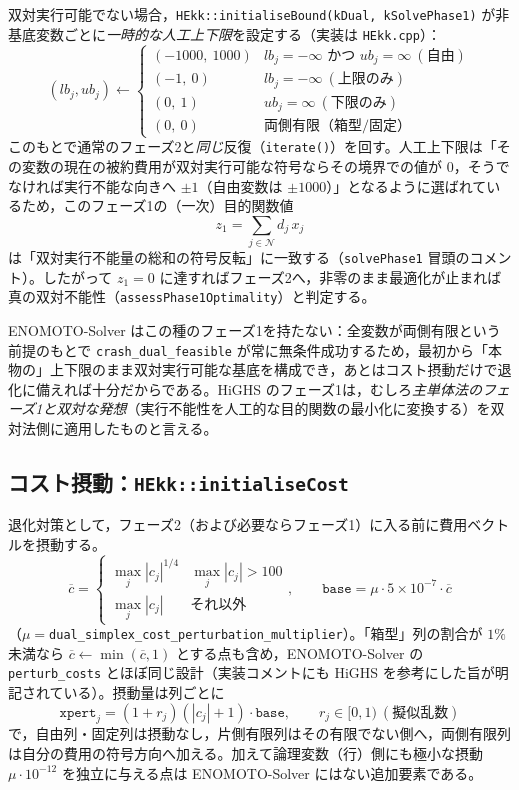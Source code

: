 \documentclass[11pt,a4paper]{ltjsarticle}
\newcommand{\code}[1]{\texttt{#1}}
\begin{document}
双対実行可能でない場合，\code{HEkk::initialiseBound(kDual, kSolvePhase1)} が非基底変数ごとに\emph{一時的な人工上下限}を設定する（実装は \code{HEkk.cpp}）：
\[
  (lb_j, ub_j) \leftarrow
  \begin{cases}
    (-1000,\ 1000) & lb_j=-\infty \text{ かつ } ub_j=\infty\ (\text{自由})\\
    (-1,\ 0) & lb_j = -\infty\ (\text{上限のみ})\\
    (0,\ 1) & ub_j = \infty\ (\text{下限のみ})\\
    (0,\ 0) & \text{両側有限（箱型/固定）}
  \end{cases}
\]
このもとで通常のフェーズ2と\emph{同じ}反復（\code{iterate()}）を回す。人工上下限は「その変数の現在の被約費用が双対実行可能な符号ならその境界での値が $0$，そうでなければ実行不能な向きへ $\pm 1$（自由変数は $\pm 1000$）」となるように選ばれているため，このフェーズ1の（一次）目的関数値
\[
  z_1 = \sum_{j\in\mathcal N} d_j\, x_j
\]
は「双対実行不能量の総和の符号反転」に一致する（\code{solvePhase1} 冒頭のコメント）。したがって $z_1=0$ に達すればフェーズ2へ，非零のまま最適化が止まれば真の双対不能性（\code{assessPhase1Optimality}）と判定する。

ENOMOTO-Solver はこの種のフェーズ1を持たない：全変数が両側有限という前提のもとで \code{crash\_dual\_feasible} が常に無条件成功するため，最初から「本物の」上下限のまま双対実行可能な基底を構成でき，あとはコスト摂動だけで退化に備えれば十分だからである。HiGHS のフェーズ1は，むしろ\emph{主単体法のフェーズ1と双対な発想}（実行不能性を人工的な目的関数の最小化に変換する）を双対法側に適用したものと言える。

\subsection{コスト摂動：\code{HEkk::initialiseCost}}

退化対策として，フェーズ2（および必要ならフェーズ1）に入る前に費用ベクトルを摂動する。
\[
  \overline c = \begin{cases}\max_j|c_j|^{1/4} & \max_j|c_j|>100\\ \max_j|c_j| & \text{それ以外}\end{cases},
  \qquad
  \code{base} = \mu \cdot 5\times10^{-7}\cdot \overline c
\]
（$\mu=$\code{dual\_simplex\_cost\_perturbation\_multiplier}）。「箱型」列の割合が $1\%$ 未満なら $\overline c \leftarrow \min(\overline c, 1)$ とする点も含め，ENOMOTO-Solver の \code{perturb\_costs} とほぼ同じ設計（実装コメントにも HiGHS を参考にした旨が明記されている）。摂動量は列ごとに
\[
  \code{xpert}_j = (1+r_j)(|c_j|+1)\cdot\code{base}, \qquad r_j \in [0,1)\ (\text{擬似乱数})
\]
で，自由列・固定列は摂動なし，片側有限列はその有限でない側へ，両側有限列は自分の費用の符号方向へ加える。加えて論理変数（行）側にも極小な摂動 $\mu \cdot 10^{-12}$ を独立に与える点は ENOMOTO-Solver にはない追加要素である。
\end{document}
